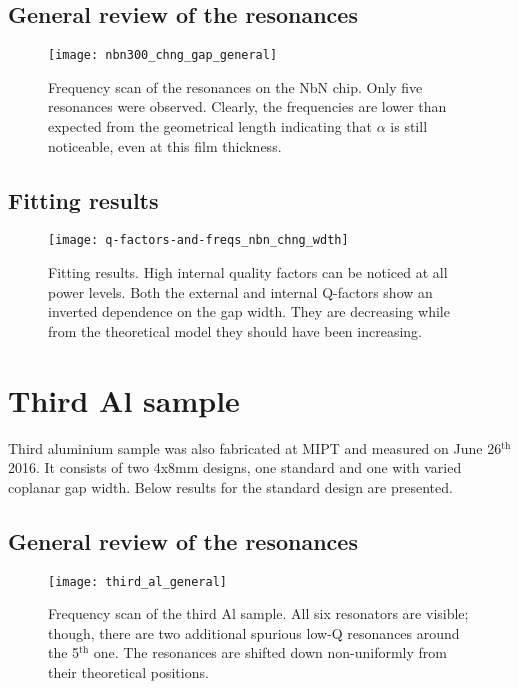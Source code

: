 \documentclass[12pt]{article}
\numberwithin{equation}{section}
\begin{document}
\subsection{General review of the resonances}

\begin{figure}[h!]
\centering
\texttt{[image: nbn300\_chng\_gap\_general]}
\caption{Frequency scan of the resonances on the NbN chip. Only five resonances were observed. Clearly, the frequencies are lower than expected from the geometrical length indicating that $\alpha$ is still noticeable, even at this film thickness.}
\end{figure}

\subsection{Fitting results}

\begin{figure}[h!]
\centering
\texttt{[image: q-factors-and-freqs\_nbn\_chng\_wdth]}
\caption{Fitting results. High internal quality factors can be noticed at all power levels. Both the external and internal Q-factors show an inverted dependence on the gap width. They are decreasing while from the theoretical model they should have been increasing.}
\end{figure}

\section{Third Al sample}

Third aluminium sample was also fabricated at MIPT and measured on June 26$^\text{th}$ 2016. It consists of two 4x8mm designs, one standard and one with varied coplanar gap width. Below results for the standard design are presented.

\subsection{General review of the resonances}

\begin{figure}[h]
\centering
\texttt{[image: third\_al\_general]}
\caption{Frequency scan of the third Al sample. All six resonators are visible; though, there are two additional spurious low-Q resonances around the 5$^\text{th}$ one. The resonances are shifted down non-uniformly from their theoretical positions.}
\label{fig:third_al_general}
\end{figure}
\end{document}
